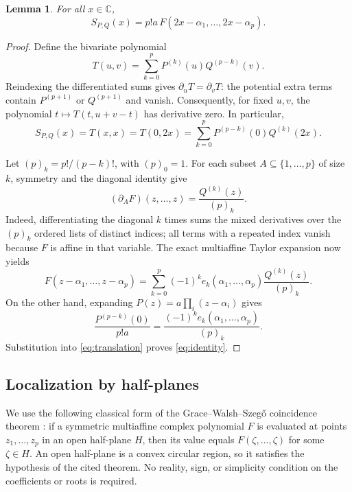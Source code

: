 \documentclass[11pt]{article}
\newtheorem{lemma}{Lemma}
\begin{document}
\begin{lemma}\label{lem:identity}
For all $x\in\mathbb C$,
\begin{equation}\label{eq:identity}
 S_{P,Q}(x)=p!a\,F(2x-\alpha_1,\ldots,2x-\alpha_p).
\end{equation}
\end{lemma}
\begin{proof}
Define the bivariate polynomial
\[
 T(u,v)=\sum_{k=0}^pP^{(k)}(u)Q^{(p-k)}(v).
\]
Reindexing the differentiated sums gives $\partial_uT=\partial_vT$:
the potential extra terms contain $P^{(p+1)}$ or $Q^{(p+1)}$ and vanish.
Consequently, for fixed $u,v$, the polynomial
$t\mapsto T(t,u+v-t)$ has derivative zero. In particular,
\begin{equation}\label{eq:translation}
 S_{P,Q}(x)=T(x,x)=T(0,2x)
    =\sum_{k=0}^pP^{(p-k)}(0)Q^{(k)}(2x).
\end{equation}

Let $(p)_k=p!/(p-k)!$, with $(p)_0=1$.
For each subset $A\subseteq\{1,\ldots,p\}$ of size $k$, symmetry and
the diagonal identity give
\[
 (\partial_A F)(z,\ldots,z)=\frac{Q^{(k)}(z)}{(p)_k}.
\]
Indeed, differentiating the diagonal $k$ times sums the mixed derivatives
over the $(p)_k$ ordered lists of distinct indices; all terms with a
repeated index vanish because $F$ is affine in that variable.
The exact multiaffine Taylor expansion now yields
\[
 F(z-\alpha_1,\ldots,z-\alpha_p)
   =\sum_{k=0}^p(-1)^ke_k(\alpha_1,\ldots,\alpha_p)
                      \frac{Q^{(k)}(z)}{(p)_k}.
\]
On the other hand, expanding $P(z)=a\prod_i(z-\alpha_i)$ gives
\[
 \frac{P^{(p-k)}(0)}{p!a}
   =\frac{(-1)^ke_k(\alpha_1,\ldots,\alpha_p)}{(p)_k}.
\]
Substitution into \eqref{eq:translation} proves \eqref{eq:identity}.
\end{proof}

\subsection*{Localization by half-planes}
We use the following classical form of the Grace--Walsh--Szeg\H{o}
coincidence theorem \cite[Lemma 6.13, p.~106]{pemantle}: if a symmetric
multiaffine complex polynomial $F$ is evaluated at points
$z_1,\ldots,z_p$ in an open half-plane $H$, then its value equals
$F(\zeta,\ldots,\zeta)$ for some $\zeta\in H$.
An open half-plane is a convex circular region, so it satisfies the
hypothesis of the cited theorem. No reality, sign, or simplicity
condition on the coefficients or roots is required.
\end{document}
